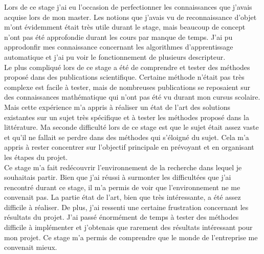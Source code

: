 Lors de ce stage j'ai eu l'occasion de perfectionner les connaissances que j'avais acquise lors de mon master.
Les notions que j'avais vu de reconnaissance d'objet m'ont évidemment était très utile durant le stage, mais 
beaucoup de concept n'ont pas été approfondie durant les cours par manque de temps. J'ai pu approdonfir mes 
connaissance concernant les algorithmes d'apprentissage automatique et j'ai pu voir le fonctionnement de plusieurs
descripteur.\\ 

Le plus compliqué lors de ce stage a été de comprendre et tester des méthodes proposé dans des publications scientifique.
Certaine méthode n'était pas très complexe est facile à tester, mais de nombreuses publications se reposaient sur des connaissances
mathématique qui n'ont pas été vu durant mon cursus scolaire. Mais cette expérience m'a appris à réaliser un état de l'art des 
solutions existantes sur un sujet très spécifique et à tester les méthodes proposé dans la littérature. Ma seconde difficulté
lors de ce stage est que le sujet était assez vaste et qu'il ne fallait se perdre dans des méthodes qui s'éloigné du sujet.
Cela m'a appris à rester concentrer sur l'objectif principale en prévoyant et en organisant les étapes du projet.\\ 

Ce stage m'a fait redécouvrir l'environnement de la recherche dans lequel je souhaitais partir. Bien que j'ai réussi à surmonter
les difficultées que j'ai rencontré durant ce stage, il m'a permis de voir que l'environnement ne me convenait pas. La partie 
état de l'art, bien que très intéressante, a été assez difficile à réaliser. De plus, j'ai ressenti une certaine frustration
concernant les résultats du projet. J'ai passé énormément de temps à tester des méthodes difficile à implémenter et j'obtenais
que rarement des résultats intéressant pour mon projet. Ce stage m'a permis de comprendre que le monde de l'entreprise me
convenait mieux.
